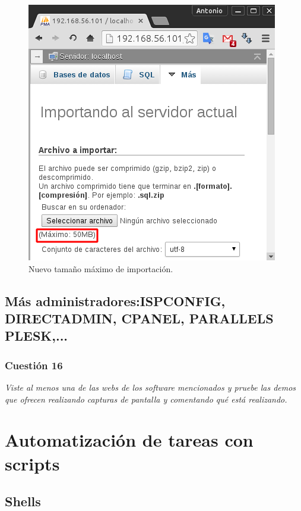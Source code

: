 \begin{figure}[H]
    \begin{center}
        \includegraphics[scale=0.5]{imagenes/img38}
        \caption{Nuevo tamaño máximo de importación.}
        \label{fig35}
    \end{center}
\end{figure}

\subsection{Más administradores:ISPCONFIG, DIRECTADMIN, CPANEL, PARALLELS PLESK,... }
\subsubsection{Cuestión 16}
\textit{Viste al menos una de las webs de los software mencionados y pruebe las demos que ofrecen realizando capturas de pantalla y comentando qué está realizando.}








\section{Automatización de tareas con scripts}
\subsection{Shells}
